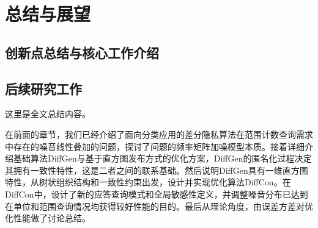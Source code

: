 
\chapter{总结与展望}

\section{创新点总结与核心工作介绍}

\section{后续研究工作}

这里是全文总结内容。

在前面的章节，我们已经介绍了面向分类应用的差分隐私算法在范围计数查询需求中存在的噪音线性叠加的问题，探讨了问题的频率矩阵加噪模型本质。接着详细介绍基础算法DiffGen与基于直方图发布方式的优化方案，DiffGen的匿名化过程决定其拥有一致性特性，这是二者之间的联系基础。然后说明DiffGen具有一维直方图特性，从树状组织结构和一致性约束出发，设计并实现优化算法DiffCon。在DiffCon中，设计了新的应答查询模式和全局敏感性定义，并调整噪音分布已达到在单位和范围查询情况均获得较好性能的目的。最后从理论角度，由误差方差对优化性能做了讨论总结。    


